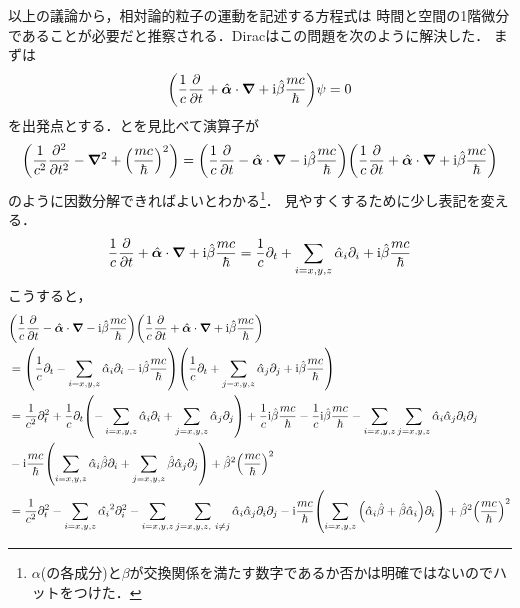 \documentclass{report}
\begin{document}
以上の議論から，相対論的粒子の運動を記述する方程式は
時間と空間の1階微分であることが必要だと推察される．Diracはこの問題を次のように解決した．
まずは
\begin{align}
  \qty(\frac{1}{c}\frac{\partial}{\partial t} + \hat{\bm{\alpha}} \cdot \grad + \mathrm{i}\hat{\beta} \frac{mc}{\hbar})\psi = 0 \label{Dirac-pre}
\end{align}
を出発点とする．とを見比べて演算子が
\begin{align}
  \qty(\frac{1}{c^2}\frac{\partial^2}{\partial t^2} - \grad^2 + \qty(\frac{mc}{\hbar})^2) = \qty(\frac{1}{c}\frac{\partial}{\partial t} - \hat{\bm{\alpha}} \cdot \grad - \mathrm{i}\hat{\beta} \frac{mc}{\hbar})\qty(\frac{1}{c}\frac{\partial}{\partial t} + \hat{\bm{\alpha}} \cdot \grad + \mathrm{i}\hat{\beta} \frac{mc}{\hbar})
\end{align}
のように因数分解できればよいとわかる\footnote{$\alpha$(の各成分)と$\beta$が交換関係を満たす数字であるか否かは明確ではないのでハットをつけた．}．
見やすくするために少し表記を変える．
\begin{align}
  \frac{1}{c}\frac{\partial}{\partial t} + \hat{\bm{\alpha}} \cdot \grad + \mathrm{i}\hat{\beta} \frac{mc}{\hbar} = \frac{1}{c}\partial_t + \sum_{i=x,y,z} \hat{\alpha}_i \partial_i + \mathrm{i}\hat{\beta} \frac{mc}{\hbar}
\end{align}
こうすると，
\begin{align}
  &\qty(\frac{1}{c}\frac{\partial}{\partial t} - \hat{\bm{\alpha}} \cdot \grad - \mathrm{i}\hat{\beta} \frac{mc}{\hbar})\qty(\frac{1}{c}\frac{\partial}{\partial t} + \hat{\bm{\alpha}} \cdot \grad + \mathrm{i}\hat{\beta} \frac{mc}{\hbar}) \\
  &=\qty(\frac{1}{c}\partial_t - \sum_{i=x,y,z} \hat{\alpha}_i \partial_i - \mathrm{i}\hat{\beta} \frac{mc}{\hbar}) \qty(\frac{1}{c}\partial_t + \sum_{j=x,y,z} \hat{\alpha}_j \partial_j + \mathrm{i}\hat{\beta} \frac{mc}{\hbar})\\
  &= \frac{1}{c^2}\partial_t^2 + \frac{1}{c} \partial_t \qty(-\sum_{i=x,y,z} \hat{\alpha}_i \partial_i + \sum_{j = x,y,z} \hat{\alpha}_j \partial_j) + \frac{1}{c}\mathrm{i}\hat{\beta}\frac{mc}{\hbar} - \frac{1}{c}\mathrm{i}\hat{\beta}\frac{mc}{\hbar} 
  - \sum_{i=x,y,z} \sum_{j=x,y,z} \hat{\alpha}_i \hat{\alpha}_j \partial_i \partial_j\\ 
  &-\mathrm{i}\frac{mc}{\hbar}\qty(\sum_{i=x,y,z} \hat{\alpha}_i \hat{\beta} \partial_i + \sum_{j=x,y,z} \hat{\beta} \hat{\alpha}_j \partial_j)
  + \hat{\beta}^2\qty(\frac{mc}{\hbar})^2\\
  &= \frac{1}{c^2}\partial_t^2 - \sum_{i=x,y,z} \hat{\alpha_i}^2 \partial_i^2 - \sum_{i=x,y,z} \sum_{j=x,y,z,\ i \neq j} \hat{\alpha}_i \hat{\alpha}_j \partial_i \partial_j
  -\mathrm{i}\frac{mc}{\hbar}\qty(\sum_{i=x,y,z} \qty( \hat{\alpha}_i \hat{\beta} + \hat{\beta} \hat{\alpha}_i )\partial_i) + \hat{\beta}^2\qty(\frac{mc}{\hbar})^2
\end{align}
\end{document}

